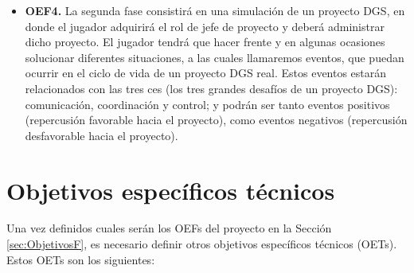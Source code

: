 \begin{itemize}
	\item \textbf{OEF4.} La segunda fase consistirá en una simulación de un proyecto DGS, en donde el jugador adquirirá el rol de jefe de proyecto y deberá administrar dicho proyecto. El jugador tendrá que hacer frente y en algunas ocasiones solucionar diferentes situaciones, a las cuales llamaremos eventos, que puedan ocurrir en el ciclo de vida de un proyecto DGS real. Estos eventos estarán relacionados con las tres ces (los tres grandes desafíos de un proyecto DGS): comunicación, coordinación y control; y podrán ser tanto eventos positivos (repercusión favorable hacia el proyecto), como eventos negativos (repercusión desfavorable hacia el proyecto).
\end{itemize}


\section{Objetivos específicos técnicos}
\label{sec:ObjetivosT}

Una vez definidos cuales serán los OEFs del proyecto en la Sección \ref{sec:ObjetivosF}, es necesario definir otros objetivos específicos técnicos (OETs). Estos OETs son los siguientes:


